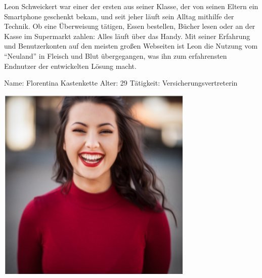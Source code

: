 Leon Schweickert war einer der ersten aus seiner Klasse, der von seinen Eltern ein Smartphone geschenkt bekam, und seit jeher läuft sein Alltag mithilfe der Technik.
Ob eine Überweisung tätigen, Essen bestellen, Bücher lesen oder an der Kasse im Supermarkt zahlen: Alles läuft über das Handy.
Mit seiner Erfahrung und Benutzerkonten auf den meisten großen Webseiten ist Leon die Nutzung vom \enquote{Neuland} in Fleisch und Blut übergegangen, was ihn zum erfahrensten Endnutzer der entwickelten Lösung macht.

\newpage
{}
\begin{minipage}[t]{0.5\textwidth} 	\vspace{0.2\baselineskip} %
	\begin{entrylist}
		\entry
		{Name:}
		{Florentina Kastenkette}
		\entry
		{Alter:}
		{29}
		\entry
		{Tätigkeit:}
		{Versicherungsvertreterin}
	\end{entrylist}
	\begin{barchart}{5.0}\hspace{-1.5mm}
	\end{barchart}
\end{minipage}
\hfil
\begin{minipage}[t]{0.4\textwidth} 	\vspace{0.0\baselineskip} %
	\flushright
	\includegraphics[width=0.70\textwidth]{img/personas/florentina}
\end{minipage}

